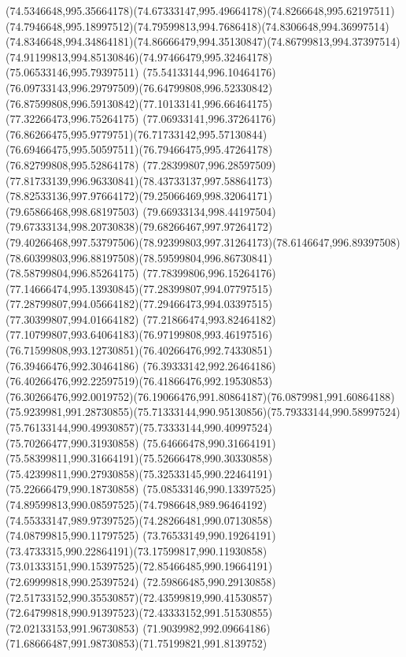{{	\curveto(74.5346648,995.35664178)(74.67333147,995.49664178)(74.8266648,995.62197511)
	\curveto(74.7946648,995.18997512)(74.79599813,994.7686418)(74.8306648,994.36997514)
	\curveto(74.8346648,994.34864181)(74.86666479,994.35130847)(74.86799813,994.37397514)
	\curveto(74.91199813,994.85130846)(74.97466479,995.32464178)(75.06533146,995.79397511)
	\curveto(75.54133144,996.10464176)(76.09733143,996.29797509)(76.64799808,996.52330842)
	\curveto(76.87599808,996.59130842)(77.10133141,996.66464175)(77.32266473,996.75264175)
	\curveto(77.06933141,996.37264176)(76.86266475,995.9779751)(76.71733142,995.57130844)
	\curveto(76.69466475,995.50597511)(76.79466475,995.47264178)(76.82799808,995.52864178)
	\curveto(77.28399807,996.28597509)(77.81733139,996.96330841)(78.43733137,997.58864173)
	\curveto(78.82533136,997.97664172)(79.25066469,998.32064171)(79.65866468,998.68197503)
	\curveto(79.66933134,998.44197504)(79.67333134,998.20730838)(79.68266467,997.97264172)
	\curveto(79.40266468,997.53797506)(78.92399803,997.31264173)(78.6146647,996.89397508)
	\curveto(78.60399803,996.88197508)(78.59599804,996.86730841)(78.58799804,996.85264175)
	\curveto(77.78399806,996.15264176)(77.14666474,995.13930845)(77.28399807,994.07797515)
	\curveto(77.28799807,994.05664182)(77.29466473,994.03397515)(77.30399807,994.01664182)
	\curveto(77.21866474,993.82464182)(77.10799807,993.64064183)(76.97199808,993.46197516)
	\curveto(76.71599808,993.12730851)(76.40266476,992.74330851)(76.39466476,992.30464186)
	\curveto(76.39333142,992.26464186)(76.40266476,992.22597519)(76.41866476,992.19530853)
	\curveto(76.30266476,992.0019752)(76.19066476,991.80864187)(76.0879981,991.60864188)
	\curveto(75.9239981,991.28730855)(75.71333144,990.95130856)(75.79333144,990.58997524)
	\curveto(75.76133144,990.49930857)(75.73333144,990.40997524)(75.70266477,990.31930858)
	\curveto(75.64666478,990.31664191)(75.58399811,990.31664191)(75.52666478,990.30330858)
	\curveto(75.42399811,990.27930858)(75.32533145,990.22464191)(75.22666479,990.18730858)
	\curveto(75.08533146,990.13397525)(74.89599813,990.08597525)(74.7986648,989.96464192)
	\curveto(74.55333147,989.97397525)(74.28266481,990.07130858)(74.08799815,990.11797525)
	\curveto(73.76533149,990.19264191)(73.4733315,990.22864191)(73.17599817,990.11930858)
	\curveto(73.01333151,990.15397525)(72.85466485,990.19664191)(72.69999818,990.25397524)
	\curveto(72.59866485,990.29130858)(72.51733152,990.35530857)(72.43599819,990.41530857)
	\curveto(72.64799818,990.91397523)(72.43333152,991.51530855)(72.02133153,991.96730853)
	\curveto(71.9039982,992.09664186)(71.68666487,991.98730853)(71.75199821,991.8139752)
}}
